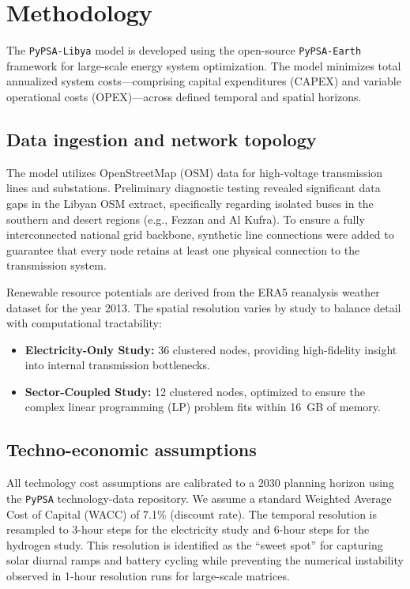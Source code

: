 \documentclass[preprint,12pt]{elsarticle}
\begin{document}
\section{Methodology}
\label{sec:methodology}

The \texttt{PyPSA-Libya} model is developed using the open-source \texttt{PyPSA-Earth} framework for large-scale energy system optimization. The model minimizes total annualized system costs—comprising capital expenditures (CAPEX) and variable operational costs (OPEX)—across defined temporal and spatial horizons.

\subsection{Data ingestion and network topology}
The model utilizes OpenStreetMap (OSM) data for high-voltage transmission lines and substations. Preliminary diagnostic testing revealed significant data gaps in the Libyan OSM extract, specifically regarding isolated buses in the southern and desert regions (e.g., Fezzan and Al Kufra). To ensure a fully interconnected national grid backbone, synthetic line connections were added to guarantee that every node retains at least one physical connection to the transmission system.

Renewable resource potentials are derived from the ERA5 reanalysis weather dataset for the year 2013. The spatial resolution varies by study to balance detail with computational tractability:
\begin{itemize}
    \item \textbf{Electricity-Only Study:} 36 clustered nodes, providing high-fidelity insight into internal transmission bottlenecks.
    \item \textbf{Sector-Coupled Study:} 12 clustered nodes, optimized to ensure the complex linear programming (LP) problem fits within 16~GB of memory.
\end{itemize}

\subsection{Techno-economic assumptions}
All technology cost assumptions are calibrated to a 2030 planning horizon using the \texttt{PyPSA} technology-data repository. We assume a standard Weighted Average Cost of Capital (WACC) of 7.1\% (discount rate). The temporal resolution is resampled to 3-hour steps for the electricity study and 6-hour steps for the hydrogen study. This resolution is identified as the ``sweet spot'' for capturing solar diurnal ramps and battery cycling while preventing the numerical instability observed in 1-hour resolution runs for large-scale matrices.
\end{document}
